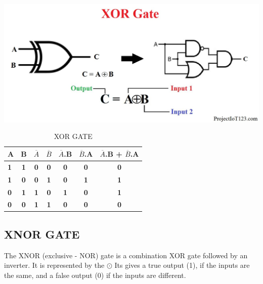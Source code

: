 \documentclass{article}
\begin{document}
\includegraphics[width=0.7\linewidth]{xor}
\begin{table}[h!]
 \begin{center}
 	\caption{XOR GATE}
 	\begin{tabular}{l|c|c|c|c|c|c|}
 		\textbf{A} & \textbf{B} & \textbf{$\overline{A}$} & \textbf{$\overline{B}$} & \textbf{$\overline{A}$.B} & \textbf{$\overline{B}$.A} & \textbf{$\overline{A}$.B + $\overline{B}$.A} \\
 		\hline
 		\textbf{1} & \textbf{1} & \textbf{0} & \textbf{0} & \textbf{0} & \textbf{0} & \textbf{0} \\
 		\textbf{1} & \textbf{0} & \textbf{0} & \textbf{1} & \textbf{0} & \textbf{1} & \textbf{1} \\
 		\textbf{0} & \textbf{1} & \textbf{1} & \textbf{0} & \textbf{1} & \textbf{0} & \textbf{1} \\
 		\textbf{0} & \textbf{0} & \textbf{1} & \textbf{1} & \textbf{0} & \textbf{0} & \textbf{0}
 	\end{tabular}
 \end{center}
\end{table}
\newpage
\subsection{XNOR GATE}
The XNOR (exclusive - NOR) gate is a combination XOR gate followed by an inverter. It is represented by the $\odot$
Its gives a  true output (1), if the inputs are the same, and a false output (0) if the inputs are different. 
\end{document}
